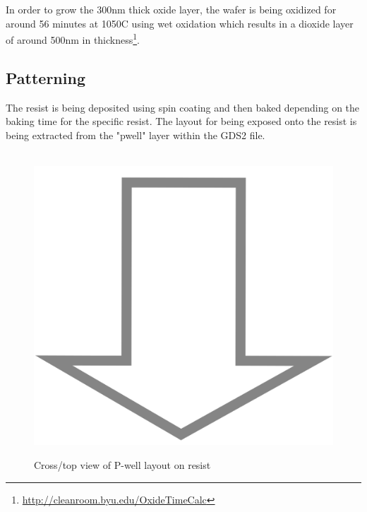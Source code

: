 In order to grow the 300nm thick oxide layer, the wafer is being oxidized for around 56 minutes at 1050\degree C using wet oxidation which results in a dioxide layer of around 500nm in thickness\footnote{\url{http://cleanroom.byu.edu/OxideTimeCalc}}.

\subsection{Patterning}
The resist is being deposited using spin coating and then baked depending on the baking time for the specific resist.
The layout for being exposed onto the resist is being extracted from the "pwell" layer within the GDS2 file.
\begin{figure}[H]
	\centering
	\begin{tikzpicture}[node distance = 3cm, auto, thick,scale=\CrossAndTopSection, every node/.style={transform shape}]
		
	\end{tikzpicture}
	\begin{tikzpicture}[node distance = 3cm, auto, thick,scale=\CrossAndTopSection, every node/.style={transform shape}]
		
	\end{tikzpicture} \\
	\includegraphics[scale=0.01]{down_arrow.png} \\
	\begin{tikzpicture}[node distance = 3cm, auto, thick,scale=\CrossAndTopSection, every node/.style={transform shape}]
		
	\end{tikzpicture}
	\begin{tikzpicture}[node distance = 3cm, auto, thick,scale=\CrossAndTopSection, every node/.style={transform shape}]
		
	\end{tikzpicture}
	\caption{Cross/top view of P-well layout on resist}
\end{figure}
